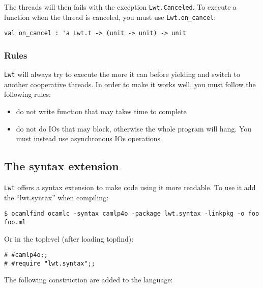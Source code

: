 \documentclass{article}
\newcommand{\lwt}{\texttt{Lwt}\xspace}
\begin{document}
The threads will then fails with the exception
\texttt{Lwt.Canceled}. To execute a function when the thread is
canceled, you must use \texttt{Lwt.on\_cancel}:

\begin{verbatim}
val on_cancel : 'a Lwt.t -> (unit -> unit) -> unit
\end{verbatim}

\subsubsection{Rules}

\lwt will always try to execute the more it can before yielding and
switch to another cooperative threads. In order to make it works well,
you must follow the following rules:

\begin{itemize}
\item do not write function that may takes time to complete
\item do not do IOs that may block, otherwise the whole program will
  hang. You must instead use asynchronous IOs operations
\end{itemize}

\subsection{The syntax extension}

\lwt offers a syntax extension to make code using it more readable.
To use it add the ``lwt.syntax'' when compiling:

\begin{verbatim}
$ ocamlfind ocamlc -syntax camlp4o -package lwt.syntax -linkpkg -o foo foo.ml
\end{verbatim}

Or in the toplevel (after loading topfind):

\begin{verbatim}
# #camlp4o;;
# #require "lwt.syntax";;
\end{verbatim}

The following construction are added to the language:
\end{document}
